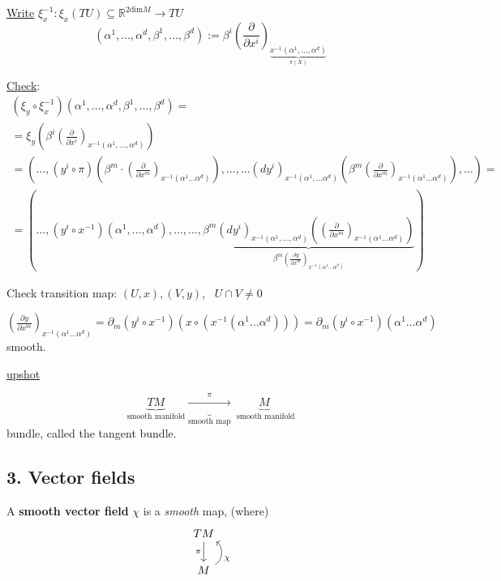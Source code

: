 \begin{enumerate}
		\underline{Write} $\xi_x^{-1} : \xi_x(TU) \subseteq \mathbb{R}^{2\text{dim}M} \to TU$
		\[
		(\alpha^1 , \dots , \alpha^d, \beta^1, \dots , \beta^d) := \beta^i \left( \frac{ \partial }{ \partial x^i} \right)_{ \underbrace{ x^{-1}(\alpha^1 , \dots , \alpha^d) }_{\pi(X)} }
		\]
		
		\underline{Check}: \[
		\begin{gathered}
		(\xi_y \circ \xi_x^{-1})(\alpha^1 , \dots , \alpha^d, \beta^1, \dots , \beta^d) = \\
		= \xi_y \left( \beta^i \left( \frac{ \partial }{ \partial x^i} \right)_{x^{-1}(\alpha^1 , \dots , \alpha^d) } \right) \\
		= \left( \dots, (y^i \circ \pi)( \beta^m \cdot \left( \frac{ \partial }{ \partial x^m} \right)_{x^{-1}(\alpha^1 \dots \alpha^d) } )  , \dots , \dots (dy^i)_{x^{-1}(\alpha^1, \dots \alpha^d) } \left( \beta^m \left( \frac{ \partial }{ \partial x^m} \right)_{x^{-1}(\alpha^1 \dots \alpha^d) } \right) , \dots   \right) = \\
		= ( \dots , (y^i \circ x^{-1})(\alpha^1 , \dots , \alpha^d), \dots , \dots , \underbrace{ \beta^m(dy^i)_{x^{-1} (\alpha^1, \dots , \alpha^d) } \left( \left( \frac{ \partial }{ \partial x^m} \right)_{x^{-1}(\alpha^1 \dots \alpha^d) } \right)}_{ \beta^m \left( \frac{ \partial y }{ \partial x^m } \right)_{x^{-1}(\alpha^1 \dots \alpha^d)} }  ) 
		\end{gathered}
		\]
		
		Check transition map: $(U, x), (V,y)$, \, $U\cap V \neq 0$
		
		
		$\left( \frac{ \partial y }{ \partial x^m } \right)_{x^{-1}(\alpha^1 \dots \alpha^d)} = \partial_m (y^i \circ x^{-1} )( x\circ (x^{-1}(\alpha^1 \dots \alpha^d) ) ) = \partial_m (y^i \circ x^{-1} )( \alpha^1 \dots \alpha^d)$ smooth.  
		
		\underline{upshot}
		
		\[
		\underbrace{TM}_{\text{smooth manifold}} \underbrace{ \xrightarrow{\pi} }_{\text{smooth map} } \underbrace{M}_{\text{ smooth manifold} }
		\]
		bundle, called the tangent bundle.
		
	\end{enumerate}
	
	\subsection*{3. Vector fields}
	
	\begin{definition}
		A \textbf{smooth vector field} $\chi$ is a \emph{smooth} map, (where)
		\[
\begin{tikzcd}
TM \arrow[d, swap, "\pi"] \\
M \arrow[bend right=60,swap]{u}{\chi} \\
\end{tikzcd}		
	\]
	\end{definition}


